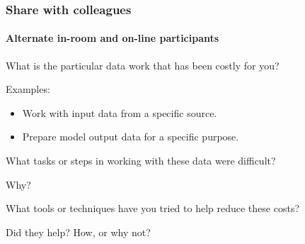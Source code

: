 \documentclass[14pt,aspectratio=169]{beamer}
\begin{document}
\begin{frame}
  \frametitle{Share with colleagues}
  \framesubtitle{Alternate in-room and on-line participants}

  What is the particular data work that has been costly for you?

  Examples:
  \begin{itemize}
    \item Work with input data from a specific source.
    \item Prepare model output data for a specific purpose.
  \end{itemize}

  \pause
  \bigskip
  What tasks or steps in working with these data were difficult?

  Why?

  \pause
  \bigskip
  What tools or techniques have you tried to help reduce these costs?

  Did they help? How, or why not?
\end{frame}
\end{document}
